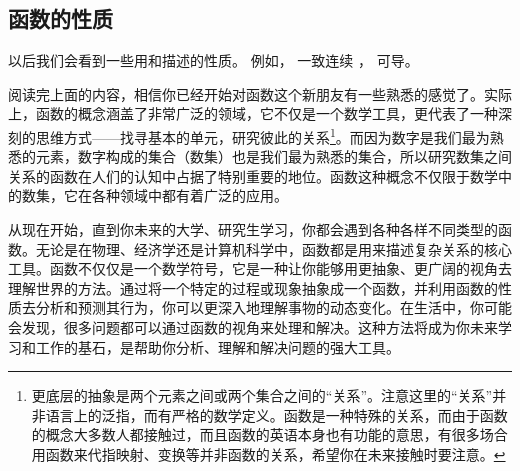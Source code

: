 \subsection{函数的性质}
以后我们会看到一些用和描述的性质。 例如， 一致连续 %
， 可导。

阅读完上面的内容，相信你已经开始对函数这个新朋友有一些熟悉的感觉了。实际上，函数的概念涵盖了非常广泛的领域，它不仅是一个数学工具，更代表了一种深刻的思维方式——找寻基本的单元，研究彼此的关系\footnote{更底层的抽象是两个元素之间或两个集合之间的“关系”。注意这里的“关系”并非语言上的泛指，而有严格的数学定义。函数是一种特殊的关系，而由于函数的概念大多数人都接触过，而且函数的英语本身也有功能的意思，有很多场合用函数来代指映射、变换等并非函数的关系，希望你在未来接触时要注意。}。而因为数字是我们最为熟悉的元素，数字构成的集合（数集）也是我们最为熟悉的集合，所以研究数集之间关系的函数在人们的认知中占据了特别重要的地位。函数这种概念不仅限于数学中的数集，它在各种领域中都有着广泛的应用。

从现在开始，直到你未来的大学、研究生学习，你都会遇到各种各样不同类型的函数。无论是在物理、经济学还是计算机科学中，函数都是用来描述复杂关系的核心工具。函数不仅仅是一个数学符号，它是一种让你能够用更抽象、更广阔的视角去理解世界的方法。通过将一个特定的过程或现象抽象成一个函数，并利用函数的性质去分析和预测其行为，你可以更深入地理解事物的动态变化。在生活中，你可能会发现，很多问题都可以通过函数的视角来处理和解决。这种方法将成为你未来学习和工作的基石，是帮助你分析、理解和解决问题的强大工具。
